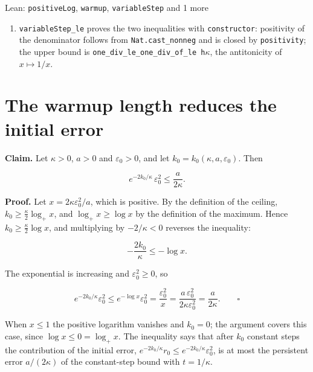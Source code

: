 \documentclass[11pt,a4paper]{article}
\begin{document}
\begin{leanbox}{Lean: \texttt{positiveLog}, \texttt{warmup}, \texttt{variableStep} and 1 more}
\begin{enumerate}
\item \texttt{variable\allowbreak{}Step\_\allowbreak{}le} proves the two inequalities with \texttt{constructor}: positivity of the denominator follows from \texttt{Nat.\allowbreak{}cast\_\allowbreak{}nonneg} and is closed by \texttt{positivity}; the upper bound is \texttt{one\_\allowbreak{}div\_\allowbreak{}le\_\allowbreak{}one\_\allowbreak{}div\_\allowbreak{}of\_\allowbreak{}le h\ensuremath{\kappa}}, the antitonicity of \(x\mapsto1/x\).

\end{enumerate}
\end{leanbox}

\section{\texorpdfstring{The warmup length reduces the initial error}{The warmup length reduces the initial error}}


\textbf{Claim.} Let \(\kappa>0\), \(a>0\) and \(\varepsilon_0>0\), and let \(k_0=k_0(\kappa,a,\varepsilon_0)\). Then


\[e^{-2k_0/\kappa}\,\varepsilon_0^2\le\frac a{2\kappa}.\]


\textbf{Proof.} Let \(x=2\kappa\varepsilon_0^2/a\), which is positive. By the definition of the ceiling, \(k_0\ge\frac\kappa2\log_+x\), and \(\log_+x\ge\log x\) by the definition of the maximum. Hence \(k_0\ge\frac\kappa2\log x\), and multiplying by \(-2/\kappa<0\) reverses the inequality:


\[-\frac{2k_0}\kappa\le-\log x.\]


The exponential is increasing and \(\varepsilon_0^2\ge0\), so


\[e^{-2k_0/\kappa}\varepsilon_0^2\le e^{-\log x}\varepsilon_0^2=\frac{\varepsilon_0^2}{x}=\frac{a\,\varepsilon_0^2}{2\kappa\varepsilon_0^2}=\frac a{2\kappa}.\qquad\square\]


When \(x\le1\) the positive logarithm vanishes and \(k_0=0\); the argument covers this case, since \(\log x\le0=\log_+x\). The inequality says that after \(k_0\) constant steps the contribution of the initial error, \(e^{-2k_0/\kappa}r_0\le e^{-2k_0/\kappa}\varepsilon_0^2\), is at most the persistent error \(a/(2\kappa)\) of the constant-step bound with \(t=1/\kappa\).
\end{document}
